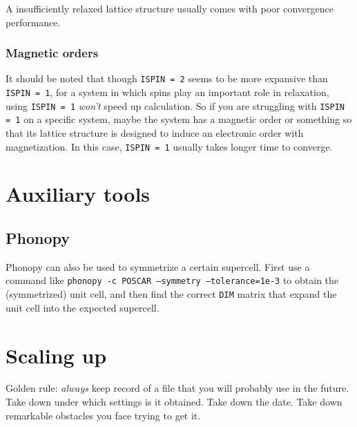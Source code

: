 \documentclass[hyperref, a4paper]{article}
\begin{document}
A insufficiently relaxed lattice structure usually comes with poor convergence performance.

\subsubsection{Magnetic orders}

It should be noted that though \texttt{ISPIN = 2} seems to be more expansive than \texttt{ISPIN = 1}, for a system in which spins play an important role in relaxation, using \texttt{ISPIN = 1} \emph{won't} speed up calculation.
So if you are struggling with \texttt{ISPIN = 1} on a specific system, maybe the system has a magnetic order or something so that its lattice structure is designed to induce an electronic order with magnetization.
In this case, \texttt{ISPIN = 1} usually takes longer time to converge.

\section{Auxiliary tools}

\subsection{Phonopy}

Phonopy can also be used to symmetrize a certain supercell.
First use a command like \texttt{phonopy -c POSCAR --symmetry --tolerance=1e-3} to obtain the (symmetrized) unit cell, and then find the correct \texttt{DIM} matrix that expand the unit cell into the expected supercell.

\section{Scaling up}

Golden rule: \emph{always} keep record of a file that you will probably use in the future. 
Take down under which settings is it obtained. Take down the date. Take down remarkable obstacles you face trying to get it.


 
\end{document}
